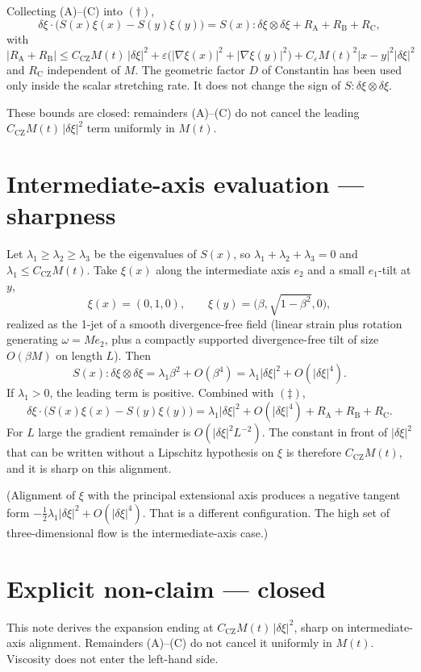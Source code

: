 \documentclass[11pt]{article}
\begin{document}
Collecting (A)--(C) into \( (\dagger) \),
\begin{equation}
\delta\xi\cdot\bigl(S(x)\xi(x)-S(y)\xi(y)\bigr)=S(x):\delta\xi\otimes\delta\xi+R_{\mathrm{A}}+R_{\mathrm{B}}+R_{\mathrm{C}}, \tag{\(\ddagger\)}
\end{equation}
with
\[
|R_{\mathrm{A}}+R_{\mathrm{B}}|\le C_{\mathrm{CZ}}M(t)\,|\delta\xi|^2+\varepsilon\bigl(|\nabla\xi(x)|^2+|\nabla\xi(y)|^2\bigr)+C_\varepsilon M(t)^2|x-y|^2|\delta\xi|^2
\]
and \( R_{\mathrm{C}} \) independent of \( M \). The geometric factor \( D \) of Constantin has been used only inside the scalar stretching rate. It does not change the sign of \( S:\delta\xi\otimes\delta\xi \).

These bounds are closed: remainders (A)--(C) do not cancel the leading \( C_{\mathrm{CZ}}M(t)\,|\delta\xi|^2 \) term uniformly in \( M(t) \).

\section{Intermediate-axis evaluation --- sharpness}
Let \( \lambda_1\ge\lambda_2\ge\lambda_3 \) be the eigenvalues of \( S(x) \), so \( \lambda_1+\lambda_2+\lambda_3=0 \) and \( \lambda_1\le C_{\mathrm{CZ}}M(t) \). Take \( \xi(x) \) along the intermediate axis \( e_2 \) and a small \( e_1 \)-tilt at \( y \),
\[
\xi(x)=(0,1,0),\qquad\xi(y)=\bigl(\beta,\sqrt{1-\beta^2},0\bigr),
\]
realized as the 1-jet of a smooth divergence-free field (linear strain plus rotation generating \( \omega=Me_2 \), plus a compactly supported divergence-free tilt of size \( O(\beta M) \) on length \( L \)). Then
\[
S(x):\delta\xi\otimes\delta\xi=\lambda_1\beta^2+O(\beta^4)=\lambda_1|\delta\xi|^2+O(|\delta\xi|^4).
\]
If \( \lambda_1>0 \), the leading term is positive. Combined with \( (\ddagger) \),
\[
\delta\xi\cdot\bigl(S(x)\xi(x)-S(y)\xi(y)\bigr)=\lambda_1|\delta\xi|^2+O(|\delta\xi|^4)+R_{\mathrm{A}}+R_{\mathrm{B}}+R_{\mathrm{C}}.
\]
For \( L \) large the gradient remainder is \( O(|\delta\xi|^2 L^{-2}) \). The constant in front of \( |\delta\xi|^2 \) that can be written without a Lipschitz hypothesis on \( \xi \) is therefore \( C_{\mathrm{CZ}}M(t) \), and it is sharp on this alignment.

(Alignment of \( \xi \) with the principal extensional axis produces a negative tangent form \( -\frac12\lambda_1|\delta\xi|^2+O(|\delta\xi|^4) \). That is a different configuration. The high set of three-dimensional flow is the intermediate-axis case.)

\section{Explicit non-claim --- closed}
This note derives the expansion ending at \( C_{\mathrm{CZ}}M(t)\,|\delta\xi|^2 \), sharp on intermediate-axis alignment. Remainders (A)--(C) do not cancel it uniformly in \( M(t) \). Viscosity does not enter the left-hand side.
\end{document}
